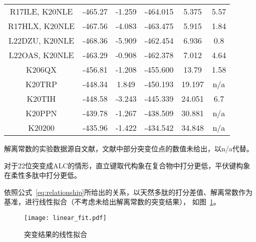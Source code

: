 \begin{table}
\begin{threeparttable}[c]
\begin{tabular}{cccccc}
      R17ILE, K20NLE          & -465.27               & -1.259             & -464.015          & 5.375                   & 5.57                     \\         
      R17HLX, K20NLE          & -467.56               & -4.083             & -463.475          & 5.915                   & 1.84                     \\         
      L22DZU, K20NLE          & -468.36               & -5.909             & -462.454          & 6.936                   & 0.8                      \\        
      L22OAS, K20NLE          & -463.29               & -0.908             & -462.378          & 7.012                   & 4.64                     \\         
      K206QX                  & -456.81               & -1.208             & -455.600          & 13.79                   & 1.58                     \\          
      K20TRP                  & -448.34               & 1.849              & -450.193          & 19.197                  & n/a                      \\         
      K20TIH                  & -448.58               & -3.243             & -445.339          & 24.051                  & 6.7                      \\          
      K20PPN                  & -439.78               & -1.267             & -438.509          & 30.881                  & n/a                      \\          
      K20200                  & -435.96               & -1.422             & -434.542          & 34.848                  & n/a                      \\          
      \bottomrule
    \end{tabular}
    \begin{tablenotes}
      \item [①] 解离常数的实验数据源自文献\cite{RN118}，文献中部分突变位点的数值未给出，以n/a代替。
      \item [②] 对于22位突变成ALC的情形，直立键取代构象在复合物中打分更低，平伏键构象在柔性多肽中打分更低。
    \end{tablenotes}
  \end{threeparttable}
\end{table}
依照公式~\eqref{eq:relationship}所给出的关系，以天然多肽的打分差值、解离常数作为基准，进行线性拟合（不考虑未给出解离常数的突变结果），
如图~\ref{fig:linear_fit}。
\begin{figure}
  \centering
  \texttt{[image: linear\_fit.pdf]}
  \caption{突变结果的线性拟合}
  \label{fig:linear_fit}
\end{figure}

